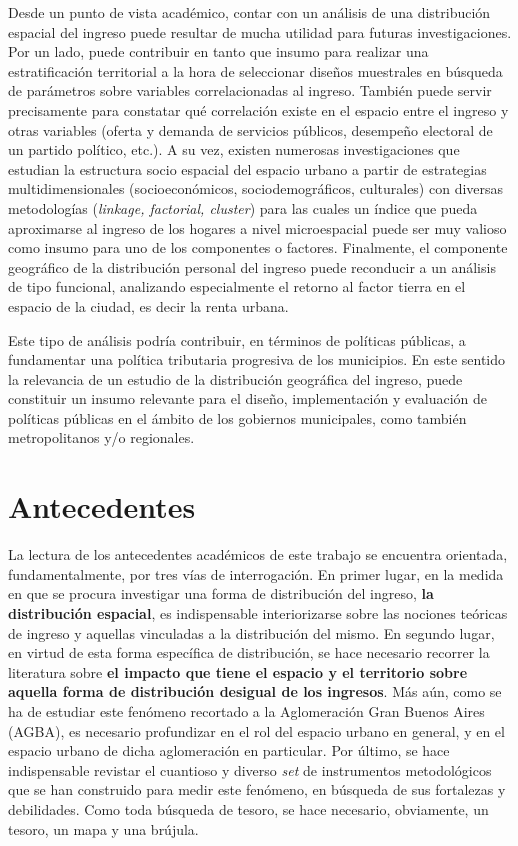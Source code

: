 Desde un punto de vista académico, contar con un análisis de una distribución espacial del ingreso puede resultar de mucha utilidad para futuras investigaciones. Por un lado, puede contribuir en tanto que insumo para realizar una estratificación territorial a la hora de seleccionar diseños muestrales en búsqueda de parámetros sobre variables correlacionadas al ingreso. También puede servir precisamente para constatar qué correlación existe en el espacio entre el ingreso y otras variables (oferta y demanda de servicios públicos, desempeño electoral de un partido político, etc.). A su vez, existen numerosas investigaciones que estudian la estructura socio espacial del espacio urbano a partir de estrategias multidimensionales (socioeconómicos, sociodemográficos, culturales) con diversas metodologías (\textit{linkage, factorial, cluster}) para las cuales un índice que pueda aproximarse al ingreso de los hogares a nivel microespacial puede ser muy valioso como insumo para uno de los componentes o factores. Finalmente, el componente geográfico de la distribución personal del ingreso puede reconducir a un análisis de tipo funcional, analizando especialmente el retorno al factor tierra en el espacio de la ciudad, es decir la renta urbana. 

Este tipo de análisis podría contribuir, en términos de políticas públicas, a fundamentar una política tributaria progresiva de los municipios. En este sentido la relevancia de un estudio de la distribución geográfica del ingreso, puede constituir un insumo relevante para el diseño, implementación y evaluación de políticas públicas en el ámbito de los gobiernos municipales, como también metropolitanos y/o regionales.


	\section{Antecedentes}

La lectura de los antecedentes académicos de este trabajo se encuentra orientada, fundamentalmente, por tres vías de interrogación. En primer lugar, en la medida en que se procura investigar una forma de distribución del ingreso, \textbf{la distribución espacial}, es indispensable interiorizarse sobre las nociones teóricas de ingreso y aquellas vinculadas a la distribución del mismo. En segundo lugar, en virtud de esta forma específica de distribución, se hace necesario recorrer la literatura sobre \textbf{el impacto que tiene el espacio y el territorio sobre aquella forma de distribución desigual de los ingresos}. Más aún, como se ha de estudiar este fenómeno recortado a la Aglomeración Gran Buenos Aires (AGBA), es necesario profundizar en el rol del espacio urbano en general, y en el espacio urbano de dicha aglomeración en particular. Por último, se hace indispensable revistar el cuantioso y diverso \textit{set} de instrumentos metodológicos que se han construido para medir este fenómeno, en búsqueda de sus fortalezas y debilidades. Como toda búsqueda de tesoro, se hace necesario, obviamente, un tesoro, un mapa y una brújula.

